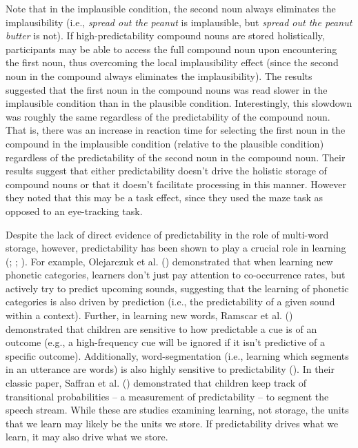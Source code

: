 \documentclass[
  12pt,
  letterpaper,
]{scrreprt}
\begin{document}
\noindent Note that in the implausible condition, the second noun always
eliminates the implausibility (i.e., \emph{spread out the peanut} is
implausible, but \emph{spread out the peanut butter} is not). If
high-predictability compound nouns are stored holistically, participants
may be able to access the full compound noun upon encountering the first
noun, thus overcoming the local implausibility effect (since the second
noun in the compound always eliminates the implausibility). The results
suggested that the first noun in the compound nouns was read slower in
the implausible condition than in the plausible condition.
Interestingly, this slowdown was roughly the same regardless of the
predictability of the compound noun. That is, there was an increase in
reaction time for selecting the first noun in the compound in the
implausible condition (relative to the plausible condition) regardless
of the predictability of the second noun in the compound noun. Their
results suggest that either predictability doesn't drive the holistic
storage of compound nouns or that it doesn't facilitate processing in
this manner. However they noted that this may be a task effect, since
they used the maze task as opposed to an eye-tracking task.

Despite the lack of direct evidence of predictability in the role of
multi-word storage, however, predictability has been shown to play a
crucial role in learning
(;
; ). For example, Olejarczuk et al.
()
demonstrated that when learning new phonetic categories, learners don't
just pay attention to co-occurrence rates, but actively try to predict
upcoming sounds, suggesting that the learning of phonetic categories is
also driven by prediction (i.e., the predictability of a given sound
within a context). Further, in learning new words, Ramscar et al.
()
demonstrated that children are sensitive to how predictable a cue is of
an outcome (e.g., a high-frequency cue will be ignored if it isn't
predictive of a specific outcome). Additionally, word-segmentation
(i.e., learning which segments in an utterance are words) is also highly
sensitive to predictability
(). In their classic paper, Saffran et al.
()
demonstrated that children keep track of transitional probabilities -- a
measurement of predictability -- to segment the speech stream. While
these are studies examining learning, not storage, the units that we
learn may likely be the units we store. If predictability drives what we
learn, it may also drive what we store.
\end{document}
